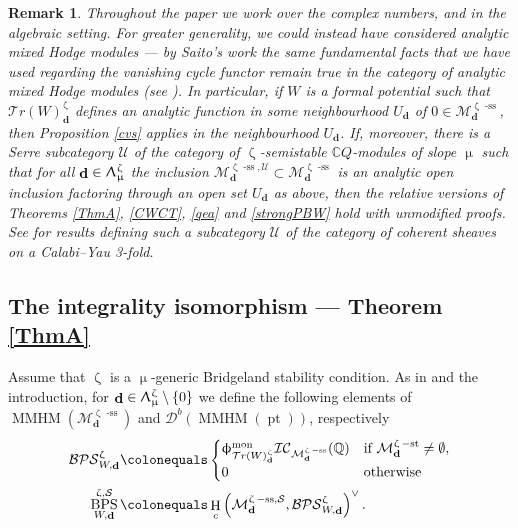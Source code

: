 \documentclass[a4paper,10pt]{amsart}
\renewcommand{\zeta}{\upzeta}
\renewcommand{\Lambda}{\Uplambda}
\renewcommand{\phi}{\upphi}
\renewcommand{\mu}{\upmu}
\newtheorem{definition}[theorem]{Definition}
\newtheorem{remark}[theorem]{Remark}
\newcommand{\SP}{\mathcal{S}}
\newcommand{\WW}{\mathcal{T}r(W)}
\newcommand{\Msp}{\mathcal{M}}
\newcommand{\ICS}{\mathcal{IC}}
\newcommand{\DTS}{\mathcal{BPS}}
\newcommand{\phim}[1]{\phi^{\mon}_{#1}}
\DeclareMathOperator{\sst}{-ss}
\DeclareMathOperator{\st}{-st}
\DeclareMathOperator{\mon}{mon}
\DeclareMathOperator{\MMHM}{MMHM}
\DeclareMathOperator{\dd}{\mathbf{d}}
\DeclareMathOperator{\DT}{BPS}
\DeclareMathOperator{\pt}{pt}
\DeclareMathOperator{\HO}{H}
\newcommand{\Db}{\mathcal{D}^{b}}
\begin{document}
\begin{remark}
Throughout the paper we work over the complex numbers, and in the algebraic setting.  For greater generality, we could instead have considered analytic mixed Hodge modules --- by Saito's work the same fundamental facts that we have used regarding the vanishing cycle functor remain true in the category of analytic mixed Hodge modules (see \cite[Sec.2]{Saito90}).  In particular, if $W$ is a formal potential such that $\WW^{\zeta}_{\dd}$ defines an analytic function in some neighbourhood $U_{\dd}$ of $0\in\Msp^{\zeta\sst}_{\dd}$, then Proposition \ref{cvs} applies in the neighbourhood $U_{\dd}$.  If, moreover, there is a Serre subcategory $\mathcal{U}$ of the category of $\zeta$-semistable $\mathbb{C}Q$-modules of slope $\mu$ such that for all $\dd\in\Lambda_{\mu}^{\zeta}$ the inclusion $\Msp^{\zeta\sst,\mathcal{U}}_{\dd}\subset \Msp^{\zeta\sst}_{\dd}$ is an analytic open inclusion factoring through an open set $U_{\dd}$ as above, then the relative versions of Theorems \ref{ThmA}, \ref{CWCT}, \ref{qea} and \ref{strongPBW} hold with unmodified proofs.  See \cite{Toda17-2} for results defining such a subcategory $\mathcal{U}$ of the category of coherent sheaves on a Calabi--Yau 3-fold.
\end{remark}



\subsection{The integrality isomorphism --- Theorem \ref{ThmA}}
Assume that $\zeta$ is a $\mu$-generic Bridgeland stability condition.  As in \cite{DaMe4} and the introduction, for $\dd\in\Lambda_{\mu}^{\zeta}\setminus \{0\}$ we define the following elements of $\MMHM(\Msp^{\zeta\sst}_{\dd})$ and $\Db(\MMHM(\pt))$, respectively
\begin{align*}
\DTS_{W,\dd}^{\zeta}\colonequals&\begin{cases} \phim{\WW^\zeta_{\dd}}\ICS_{\Msp^{\zeta \sst}_{\dd}}(\mathbb{Q})&\textrm{if }\Msp^{\zeta \st}_{\dd}\neq\emptyset ,\\0&\textrm{otherwise}\end{cases}\\
\DT^{\zeta,\SP}_{W,\dd}\colonequals &\HO_c\left(\Msp^{\zeta\sst,\SP}_{\dd},\DTS_{W,\dd}^{\zeta}\right)^{\vee}.
\end{align*}
\end{document}
